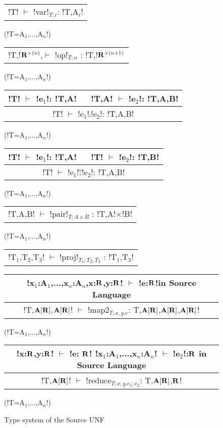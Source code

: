 \begin{figure*}[tb]
    \centering
    \begin{tabular}{c} 
    \\\hline
    !T! $\vdash$ !var!$_{T;i}$: !T,A$_i$!
    \end{tabular}(!T=A$_{1}$,...,A$_n$!)
    \hspace{0.5cm}
    \begin{tabular}{c}
        \\\hline
        !T,!$\mathbf{R}^{\times(n)}$,$\vdash$ !op!$_{T;n}$ : !T,!$\mathbf{R}^{\times(n+1)}$
    \end{tabular}(!T=A$_{1}$,...,A$_n$!)

    \begin{tabular}{c}
    !T! $\vdash$ !e$_{1}$!: !T,A! $\quad$ !T,A! $\vdash$ !e$_{2}$!: !T,A,B! \\\hline
    !T! $\vdash$ !e$_{1}$!$\comp$!e$_{2}$!: !T,A,B!
    \end{tabular}(!T=A$_{1}$,...,A$_n$!)
    \hspace{0.5cm}
    \begin{tabular}{c}
        !T! $\vdash$ !e$_{1}$!: !T,A! $\quad$ !T! $\vdash$ !e$_{2}$!: !T,B! \\\hline
        !T! $\vdash$ !e$_{1}$!$\widetilde{;}$!e$_{2}$!: !T,A,B!
    \end{tabular}(!T=A$_{1}$,...,A$_n$!)

    \begin{tabular}{c}
        \\\hline
        !T,A,B! $\vdash$ !pair!$_{T;A\times B}$ : !T,A!$\times$!B!
    \end{tabular}(!T=A$_{1}$,...,A$_n$!)

    \begin{tabular}{c}
        \\\hline
        !T$_{1}$,T$_{2}$,T$_{3}$! $\vdash$ !proj!$_{T_1;T_2;T_3}$ : !T$_{1}$,T$_{3}$!
    \end{tabular}

    \begin{tabular}{c}
        !x$_{1}$:A$_{1}$,...,x$_n$:A$_n$,x:$\mathbf{R}$,y:$\mathbf{R}$! $\vdash$ !e:$\mathbf{R}$!\quad in Source Language
        \\\hline  
        !T,$\mathbf{A}[\mathbf{R}],\mathbf{A}[\mathbf{R}]$! $\vdash$ !map2$_{T; x,y.e}$: T,$\mathbf{A}[\mathbf{R}]$,$\mathbf{A}[\mathbf{R}]$,$\mathbf{A}[\mathbf{R}]$!
    \end{tabular}(!T=A$_{1}$,...,A$_n$!)

    \begin{tabular}{c}
        !x:$\mathbf{R}$,y:$\mathbf{R}$! $\vdash$ !e: $\mathbf{R}$! \quad !x$_{1}$:A$_{1}$,...,x$_n$:A$_n$! $\vdash$ !e$_{2}$!:$\mathbf{R}$ \quad in Source Language
        \\\hline  
        !T,$\mathbf{A}[\mathbf{R}]$! $\vdash$ !reduce$_{T; x,y.e_1; e_2}$: T,$\mathbf{A}[\mathbf{R}]$,$\mathbf{R}$!
    \end{tabular}(!T=A$_{1}$,...,A$_n$!)
    \vspace{-0.2cm}
    \caption{Type system of the Source UNF}
    \vspace{-0.4cm}
    \label{fig:source_unf_typesystem}
\end{figure*}